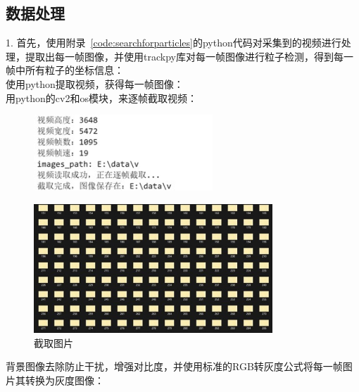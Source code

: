 \documentclass[a4paper]{report} %
\begin{document}
\subsection{数据处理}
1. 首先，使用附录~\ref{code:searchforparticles}的python代码对采集到的视频进行处理，提取出每一帧图像，并使用trackpy库对每一帧图像进行粒子检测，得到每一帧中所有粒子的坐标信息：\\
使用python提取视频，获得每一帧图像：\\
用python的cv2和os模块，来逐帧截取视频：
\begin{figure}[H]
    \includegraphics[width=0.6\textwidth]{说明.jpg}
\end{figure} 
\begin{figure}[H]
    \centering
    \includegraphics[width=0.8\textwidth]{图片.jpg}
    \caption{截取图片}
\end{figure} 
背景图像去除防止干扰，增强对比度，并使用标准的RGB转灰度公式将每一帧图片其转换为灰度图像：\\
\end{document}

